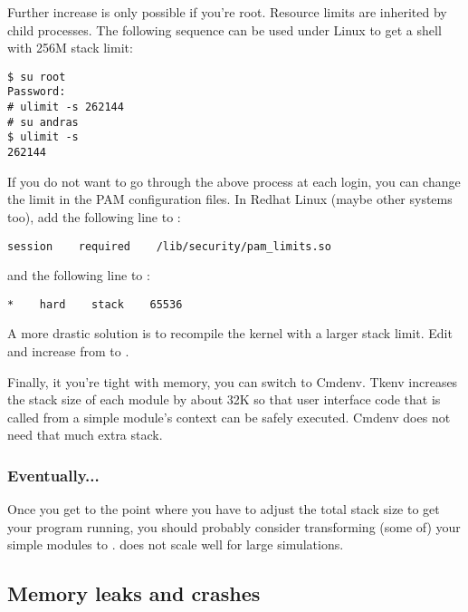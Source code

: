 Further increase is only possible if you're root.
Resource limits are inherited by child processes.
The following sequence can be used under Linux to get a shell with
256M stack limit:

\begin{verbatim}
$ su root
Password:
# ulimit -s 262144
# su andras
$ ulimit -s
262144
\end{verbatim}

If you do not want to go through the above process at each login, you
can change the limit in the PAM configuration files. In Redhat Linux
(maybe other systems too), add the following line to
:

\begin{verbatim}
session    required    /lib/security/pam_limits.so
\end{verbatim}

and the following line to :

\begin{verbatim}
*    hard    stack    65536
\end{verbatim}

\begin{sloppypar}
A more drastic solution is to recompile the kernel with a larger stack
limit. Edit  and increase
 from  to .
\end{sloppypar}

Finally, it you're tight with memory, you can switch to Cmdenv. Tkenv
increases the stack size of each module by about 32K so that user interface code that is called from a
simple module's context can be safely executed.
Cmdenv does not need that much extra stack.


\subsubsection{Eventually...}

Once you get to the point where you have to adjust the total stack size
to get your program running,
you should probably consider transforming (some of) your 
simple modules to .  does not
scale well for large simulations.



\subsection{Memory leaks and crashes}

